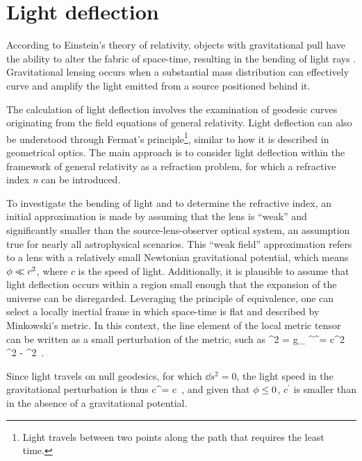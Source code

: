 \section{Light deflection}
\label{sec:light_deflection}

According to Einstein's theory of relativity, objects with gravitational pull have the ability to alter the fabric of space-time, resulting in the bending of light rays \citep{narayan_lectures_1997}
. Gravitational lensing occurs when a substantial mass distribution can effectively curve and amplify the light emitted from a source positioned behind it.

The calculation of light deflection involves the examination of geodesic curves originating from the field equations of general relativity. Light deflection can also be understood through Fermat's principle\footnote{Light travels between two points along the path that requires the least time.}, similar to how it is described in geometrical optics. The main approach is to consider light deflection within the framework of general relativity as a refraction problem, for which a refractive index \emph{n} can be introduced.

To investigate the bending of light and to determine the refractive index, an initial approximation is made by assuming that the lens is ``weak'' and significantly smaller than the source-lens-observer optical system, an assumption true for nearly all astrophysical scenarios. This ``weak field'' approximation refers to a lens with a relatively small Newtonian gravitational potential, which means $\phi \ll c^2$, where $c$ is the speed of light.
Additionally, it is plausible to assume that light deflection occurs within a region small enough that the expansion of the universe can be disregarded. Leveraging the principle of equivalence, one can select a locally inertial frame in which space-time is flat and described by Minkowski's metric. In this context, the line element of the local metric tensor can be written as a small perturbation of the metric, such as
\be
\label{eq:2.1}
^2 = g_{\m\n} ^\m {}^\n =  c^2 ^2 -  ^2 \,.
\ee

Since light travels on null geodesics, for which $\dd{s}^2 = 0$, the light speed in the gravitational perturbation is thus
\be
\label{eq:2.2}
c^\prime =  \approx c  \,,
\ee
and given that $\phi \leq 0$, $c^\prime$ is smaller than in the absence of a gravitational potential.


